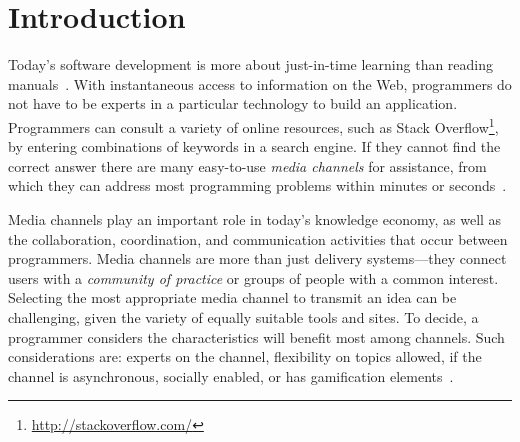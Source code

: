 \section{Introduction}
\label{cha:introduction}


    Today's software development is more about just-in-time learning than reading manuals~\cite{Hartmann2008}.
    With instantaneous access to information on the Web, programmers do not have to be experts in a particular technology to build an application.
    Programmers can consult a variety of online resources, such as Stack Overflow\footnote{\url{http://stackoverflow.com/}}, by entering combinations of keywords in a search engine.
    If they cannot find the correct answer there are many easy-to-use \textit{media channels} for assistance, from which they can address most programming problems within minutes or seconds~\cite{Mamykina2011}.

Media channels play an important role in today's knowledge economy, as well as the collaboration, coordination, and communication activities that occur between programmers.
Media channels are more than just delivery systems---they connect users with a \textit{community of practice} or groups of people with a common interest.
Selecting the most appropriate media channel to transmit an idea can be challenging, given the variety of equally suitable tools and sites.
To decide, a programmer considers the characteristics will benefit most among channels.
Such considerations are: experts on the channel, flexibility on topics allowed, if the channel is asynchronous, socially enabled, or has gamification elements~\cite{Vasilescu2014c}.



